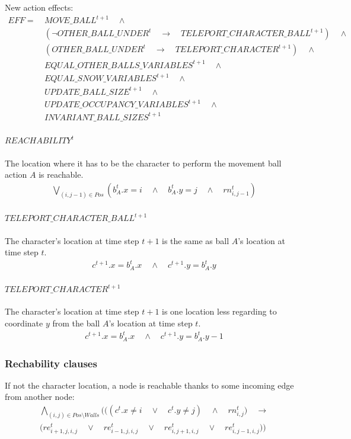 \documentclass{report}
\theoremstyle{plain}
\begin{document}
New action effects:
\begin{align*}
EFF = \ & MOVE\_BALL^{t+1} \quad \wedge \\
& (\lnot OTHER\_BALL\_UNDER^t \quad \rightarrow \quad TELEPORT\_CHARACTER\_BALL^{t+1}) \quad \wedge \\
& (OTHER\_BALL\_UNDER^t \quad \rightarrow \quad TELEPORT\_CHARACTER^{t+1}) \quad \wedge \\
& EQUAL\_OTHER\_BALLS\_VARIABLES^{t+1} \quad \wedge \\
& EQUAL\_SNOW\_VARIABLES^{t+1}  \quad \wedge \\
& UPDATE\_BALL\_SIZE^{t+1} \quad \wedge \\
& UPDATE\_OCCUPANCY\_VARIABLES^{t+1} \quad \wedge \\
& INVARIANT\_BALL\_SIZES^{t+1}
\end{align*}

\paragraph{$REACHABILITY^t$}
The location where it has to be the character to perform the movement ball action $A$ is reachable.
\begin{align*}
\bigvee \limits_{(i, j - 1) \in Pos} (b_A^t.x = i \quad \wedge \quad b_A^t.y = j \quad \wedge \quad rn_{i,j - 1}^t)
\end{align*}

\paragraph{$TELEPORT\_CHARACTER\_BALL^{t+1}$}
The character's location at time step $t+1$ is the same as ball $A$'s location at time step $t$.
\begin{align*}
c^{t+1}.x = b_A^t.x \quad \wedge \quad c^{t+1}.y = b_A^t.y
\end{align*}

\paragraph{$TELEPORT\_CHARACTER^{t+1}$}
The character's location at time step $t+1$ is one location less regarding to coordinate $y$ from the ball $A$'s location at time step $t$.
\begin{align*}
c^{t+1}.x = b_A^t.x \quad \wedge \quad c^{t+1}.y = b_A^t.y - 1
\end{align*}

\subsubsection{Rechability clauses}
If not the character location, a node is reachable thanks to some incoming edge from another node:
\begin{multline*}
\bigwedge \limits_{(i, j) \in Pos \setminus Walls} \Big( \big( (c^t.x \neq i \quad \vee \quad c^t.y \neq j) \quad \wedge \quad rn_{i,j}^t \big) \quad \rightarrow \\
\big( re_{i + 1, j, i, j}^t \quad \vee \quad re_{i - 1, j, i, j}^t \quad \vee \quad re_{i, j + 1, i, j}^t \quad \vee \quad re_{i, j - 1, i, j}^t \big) \Big)
\end{multline*}
\end{document}
